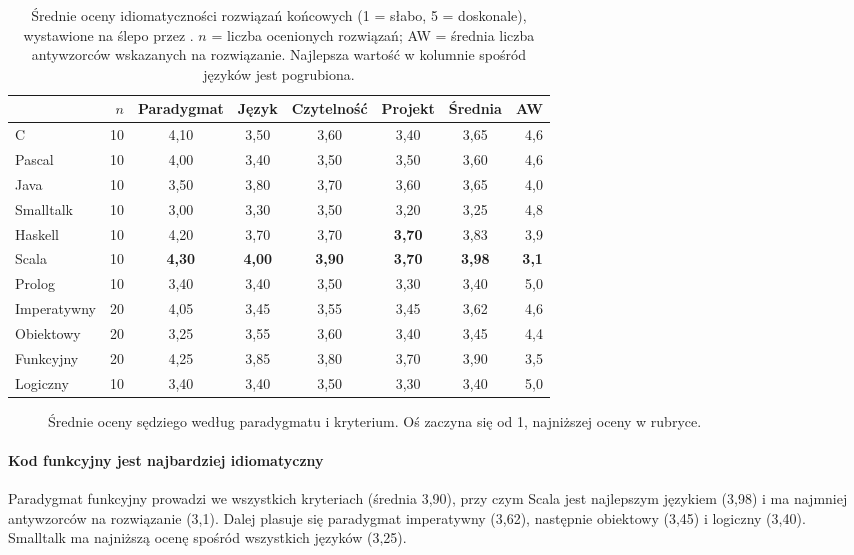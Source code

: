 \begin{table}[htbp]
  \centering
  \caption{Średnie oceny idiomatyczności rozwiązań końcowych (1 = słabo, 5 = doskonale), wystawione
    na ślepo przez \sonnet{}. $n$ = liczba ocenionych rozwiązań; AW = średnia liczba antywzorców
    wskazanych na rozwiązanie. Najlepsza wartość w kolumnie spośród języków jest pogrubiona.}
  \label{tab:judge}
  \small
  \begin{tabular}{@{}lrccccc r@{}}
    \toprule
    & $n$ & Paradygmat & Język & Czytelność & Projekt & Średnia & AW \\
    \midrule
    C         & 10 & 4,10 & 3,50 & 3,60 & 3,40 & 3,65 & 4,6 \\
    Pascal    & 10 & 4,00 & 3,40 & 3,50 & 3,50 & 3,60 & 4,6 \\
    Java      & 10 & 3,50 & 3,80 & 3,70 & 3,60 & 3,65 & 4,0 \\
    Smalltalk & 10 & 3,00 & 3,30 & 3,50 & 3,20 & 3,25 & 4,8 \\
    Haskell   & 10 & 4,20 & 3,70 & 3,70 & \textbf{3,70} & 3,83 & 3,9 \\
    Scala     & 10 & \textbf{4,30} & \textbf{4,00} & \textbf{3,90} & \textbf{3,70} & \textbf{3,98} & \textbf{3,1} \\
    Prolog    & 10 & 3,40 & 3,40 & 3,50 & 3,30 & 3,40 & 5,0 \\
    \midrule
    Imperatywny & 20 & 4,05 & 3,45 & 3,55 & 3,45 & 3,62 & 4,6 \\
    Obiektowy   & 20 & 3,25 & 3,55 & 3,60 & 3,40 & 3,45 & 4,4 \\
    Funkcyjny   & 20 & 4,25 & 3,85 & 3,80 & 3,70 & 3,90 & 3,5 \\
    Logiczny    & 10 & 3,40 & 3,40 & 3,50 & 3,30 & 3,40 & 5,0 \\
    \bottomrule
  \end{tabular}
\end{table}

\begin{figure}[htbp]
  \centering
  
  \caption{Średnie oceny sędziego według paradygmatu i kryterium. Oś zaczyna się od 1, najniższej
    oceny w rubryce.}
  \label{fig:judge}
\end{figure}

\paragraph{Kod funkcyjny jest najbardziej idiomatyczny} Paradygmat funkcyjny prowadzi we wszystkich
kryteriach (średnia 3,90), przy czym Scala jest najlepszym językiem (3,98) i ma najmniej
antywzorców na rozwiązanie (3,1). Dalej plasuje się paradygmat imperatywny (3,62), następnie
obiektowy (3,45) i logiczny (3,40). Smalltalk ma najniższą ocenę spośród wszystkich języków (3,25).

